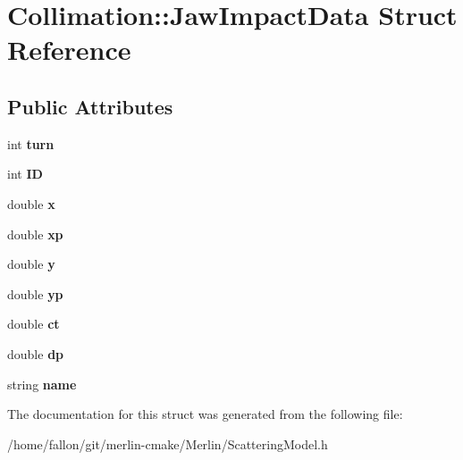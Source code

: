 \hypertarget{structCollimation_1_1JawImpactData}{}\section{Collimation\+:\+:Jaw\+Impact\+Data Struct Reference}
\label{structCollimation_1_1JawImpactData}
\subsection*{Public Attributes}
\begin{DoxyCompactItemize}
\item 
\mbox{\label{structCollimation_1_1JawImpactData_a3388b027ab02dd082e7413d6385c6234}} 
int {\bfseries turn}
\item 
\mbox{\label{structCollimation_1_1JawImpactData_a7e74338204522a7908d630eec9dc57e2}} 
int {\bfseries ID}
\item 
\mbox{\label{structCollimation_1_1JawImpactData_af315e9a3420f8a04b49308ae5c015cbe}} 
double {\bfseries x}
\item 
\mbox{\label{structCollimation_1_1JawImpactData_a4a3b4224cf8c5d0a9ba0eed85f3095bd}} 
double {\bfseries xp}
\item 
\mbox{\label{structCollimation_1_1JawImpactData_aa1e132413030fd45c7c8d6a0c61da184}} 
double {\bfseries y}
\item 
\mbox{\label{structCollimation_1_1JawImpactData_a6694dd5ef57175ba201fa437c373cb98}} 
double {\bfseries yp}
\item 
\mbox{\label{structCollimation_1_1JawImpactData_a641346d5c05b406af914dc0fcfb63437}} 
double {\bfseries ct}
\item 
\mbox{\label{structCollimation_1_1JawImpactData_a63e42384042f83750b635e929f071883}} 
double {\bfseries dp}
\item 
\mbox{\label{structCollimation_1_1JawImpactData_a0fa28bb4d11eac18eb06acfc162c0ea5}} 
string {\bfseries name}
\end{DoxyCompactItemize}


The documentation for this struct was generated from the following file\+:\begin{DoxyCompactItemize}
\item 
/home/fallon/git/merlin-\/cmake/\+Merlin/Scattering\+Model.\+h\end{DoxyCompactItemize}
